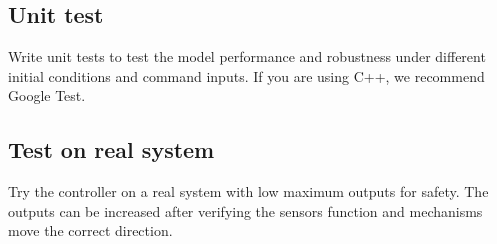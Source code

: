 \subsection{Unit test}

Write unit tests to test the \gls{model} performance and \gls{robustness} under
different initial conditions and command inputs. If you are using C++, we
recommend Google Test.

\subsection{Test on real system}

Try the controller on a real \gls{system} with low maximum outputs for safety.
The outputs can be increased after verifying the sensors function and mechanisms
move the correct direction.
